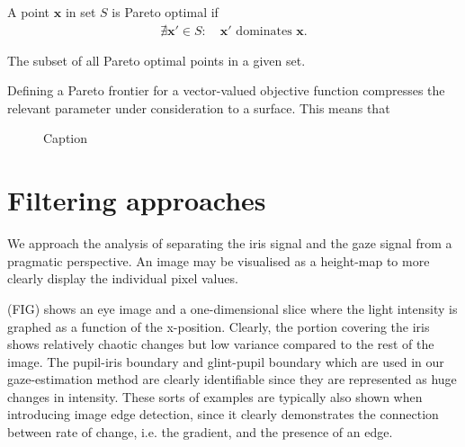 \begin{definition}\label{def:p-optimal}
A point $\mathbf{x}$ in set $S$ is Pareto optimal if
\begin{align}
    \nexists \mathbf{x'} \in S: \quad \mathbf{x'} \text{ dominates } \mathbf{x}.
\end{align}
\end{definition}

\begin{definition}\label{def:p-frontier}
The subset of all Pareto optimal points in a given set.
\end{definition}

Defining a Pareto frontier for a vector-valued objective function compresses the relevant parameter under consideration to a surface. This means that 

\begin{figure}
    \centering
    \caption{Caption}
    \label{fig:my_label}
\end{figure}



\section{Filtering approaches}
We approach the analysis of separating the iris signal and the gaze signal from a pragmatic perspective. An image may be visualised as a height-map to more clearly display the individual pixel values. 

(FIG) shows an eye image and a one-dimensional slice where the light intensity is graphed as a function of the x-position. Clearly, the portion covering the iris shows relatively chaotic changes but low variance compared to the rest of the image. The pupil-iris boundary and glint-pupil boundary which are used in our gaze-estimation method are clearly identifiable since they are represented as huge changes in intensity. These sorts of examples are typically also shown when introducing image edge detection, since it clearly demonstrates the connection between rate of change, i.e. the gradient, and the presence of an edge. 

